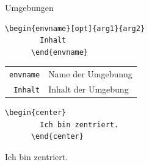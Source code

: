 \begin{Frame}[fragile]{Umgebungen}
  \begin{Definition}[Umgebung]
    \begin{lstlisting}[gobble=6,style=block]
      \begin{envname}[opt]{arg1}{arg2}
        Inhalt
      \end{envname}
    \end{lstlisting}

    \begin{tabular}{rl}
      \lstinline-envname- & Name der Umgebunng \\
      \lstinline-Inhalt- & Inhalt der Umgebung
    \end{tabular}
  \end{Definition}

  \xxx

  \begin{Beispiel}[Umgebung]
    \begin{lstlisting}[gobble=6,style=block]
      \begin{center}
        Ich bin zentriert.
      \end{center}
    \end{lstlisting}
    \begin{center}
      Ich bin zentriert.
    \end{center}
  \end{Beispiel}
\end{Frame}

